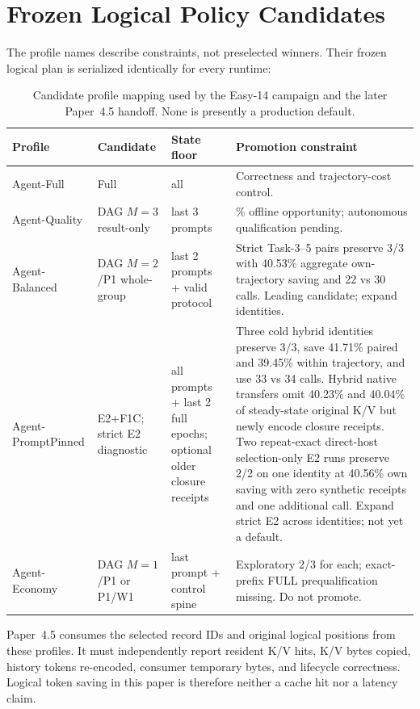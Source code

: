 \documentclass[11pt]{article}
\begin{document}
\section{Frozen Logical Policy Candidates}

The profile names describe constraints, not preselected winners.  Their frozen
logical plan is serialized identically for every runtime:

\begin{table}[H]
\centering
\footnotesize
\caption{Candidate profile mapping used by the Easy-14 campaign and the later
Paper~4.5 handoff.  None is presently a production default.}
\label{tab:main-profiles}
\begin{tabular}{>{\raggedright\arraybackslash}p{.13\linewidth}
                >{\raggedright\arraybackslash}p{.23\linewidth}
                >{\raggedright\arraybackslash}p{.20\linewidth}
                >{\raggedright\arraybackslash}p{.32\linewidth}}
\toprule
Profile & Candidate & State floor & Promotion constraint \\
\midrule
Agent-Full & Full & all & Correctness and trajectory-cost control. \\
Agent-Quality & DAG $M=3$ result-only & last 3 prompts & 17.09\% offline opportunity; autonomous qualification pending. \\
Agent-Balanced & DAG $M=2$/P1 whole-group & last 2 prompts + valid protocol & Strict Task-3--5 pairs preserve 3/3 with 40.53\% aggregate own-trajectory saving and 22 vs 30 calls. Leading candidate; expand identities. \\
Agent-PromptPinned & E2+F1C; strict E2 diagnostic & all prompts + last 2 full epochs; optional older closure receipts & Three cold hybrid identities preserve 3/3, save 41.71\% paired and 39.45\% within trajectory, and use 33 vs 34 calls. Hybrid native transfers omit 40.23\% and 40.04\% of steady-state original K/V but newly encode closure receipts. Two repeat-exact direct-host selection-only E2 runs preserve 2/2 on one identity at 40.56\% own saving with zero synthetic receipts and one additional call. Expand strict E2 across identities; not yet a default. \\
Agent-Economy & DAG $M=1$/P1 or P1/W1 & last prompt + control spine & Exploratory 2/3 for each; exact-prefix FULL prequalification missing. Do not promote. \\
\bottomrule
\end{tabular}
\end{table}

Paper~4.5 consumes the selected record IDs and original logical positions from
these profiles.  It must independently report resident K/V hits, K/V bytes
copied, history tokens re-encoded, consumer temporary bytes, and lifecycle
correctness.  Logical token saving in this paper is therefore neither a cache
hit nor a latency claim.
\end{document}
